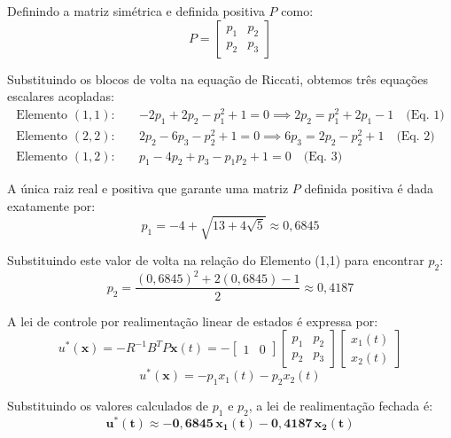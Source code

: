 \documentclass[a4paper, 12pt]{article}%
\begin{document}
Definindo a matriz simétrica e definida positiva $P$ como:
\begin{equation}
P = \begin{bmatrix} p_1 & p_2 \\ p_2 & p_3 \end{bmatrix}
\end{equation}

Substituindo os blocos de volta na equação de Riccati, obtemos três equações escalares acopladas:
\begin{align*}
\text{Elemento } (1,1): \quad & -2p_1 + 2p_2 - p_1^2 + 1 = 0 \implies 2p_2 = p_1^2 + 2p_1 - 1 \quad \text{(Eq. 1)} \\
\text{Elemento } (2,2): \quad & 2p_2 - 6p_3 - p_2^2 + 1 = 0 \implies 6p_3 = 2p_2 - p_2^2 + 1 \quad \text{(Eq. 2)} \\
\text{Elemento } (1,2): \quad & p_1 - 4p_2 + p_3 - p_1p_2 + 1 = 0 \quad \text{(Eq. 3)}
\end{align*}

A única raiz real e positiva que garante uma matriz $P$ definida positiva é dada exatamente por:
\begin{equation}
p_1 = -4 + \sqrt{13 + 4\sqrt{5}} \approx 0,6845
\end{equation}

Substituindo este valor de volta na relação do Elemento (1,1) para encontrar $p_2$:
\begin{equation}
p_2 = \frac{(0,6845)^2 + 2(0,6845) - 1}{2} \approx 0,4187
\end{equation}

A lei de controle por realimentação linear de estados é expressa por:
\begin{equation}
u^*(\mathbf{x}) = -R^{-1}B^T P \mathbf{x}(t) = -\begin{bmatrix} 1 & 0 \end{bmatrix} \begin{bmatrix} p_1 & p_2 \\ p_2 & p_3 \end{bmatrix} \begin{bmatrix} x_1(t) \\ x_2(t) \end{bmatrix}
\end{equation}
\begin{equation}
u^*(\mathbf{x}) = -p_1x_1(t) - p_2x_2(t)
\end{equation}

Substituindo os valores calculados de $p_1$ e $p_2$, a lei de realimentação fechada é:
\begin{equation}
\mathbf{u^*(t) \approx -0,6845 \, x_1(t) - 0,4187 \, x_2(t)}
\end{equation}
\end{document}
